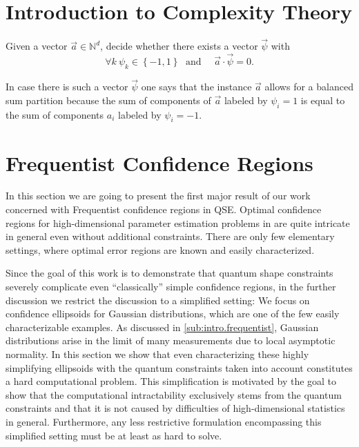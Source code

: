 \section{Introduction to Complexity Theory}
\label{sec:intro.complexity}


\begin{problem}\label{prob:ellpos.balanced_sum}
  Given a vector $\vec a \in \mathbb{N}^d$, decide whether there exists a vector $\vec \psi$ with
  \[
    \forall{k}\:\psi_{k}\in\left\{ -1,1\right\} \;\textrm{ and }\quad \vec a \cdot \vec\psi=0.
    \label{eq:ellpos.partition_vector}
  \]
\end{problem}
In case there is such a vector $\vec \psi$ one says that the instance $\vec a$ allows for a balanced sum partition because the sum of components of $\vec a$ labeled by $\psi_i = 1$ is equal to the sum of components $a_i$ labeled by $\psi_i = -1$.


\section{Frequentist Confidence Regions}
\label{sec:error.frequentist}

In this section we are going to present the first major result of our work~\cite{Suess_2016_Error} concerned with Frequentist confidence regions in QSE.
Optimal confidence regions for high-dimensional parameter estimation problems in are quite intricate in general even without additional constraints.
There are only few elementary settings, where optimal error regions are known and easily characterized.

Since the goal of this work is to demonstrate that quantum shape constraints severely complicate even ``classically'' simple confidence regions, in the further discussion we restrict the discussion to a simplified setting:
We focus on confidence ellipsoids for Gaussian distributions, which are one of the few easily characterizable examples.
As discussed in \cref{sub:intro.frequentist}, Gaussian distributions arise in the limit of many measurements due to local asymptotic normality.
In this section we show that even characterizing these highly simplifying ellipsoids with the quantum constraints taken into account constitutes a hard computational problem.
This simplification is motivated by the goal to show that the computational intractability exclusively stems from the quantum constraints and that it is not caused by difficulties of high-dimensional statistics in general.
Furthermore, any less restrictive formulation encompassing this simplified setting must be at least as hard to solve.

